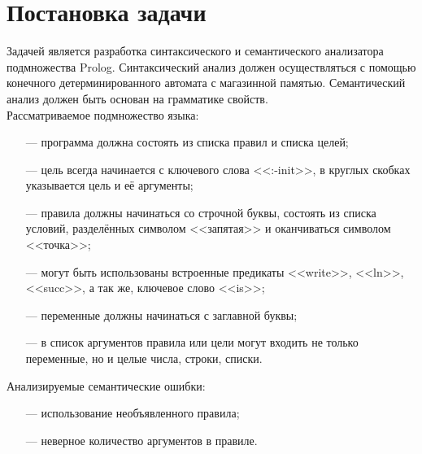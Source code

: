 \documentclass[a4paper,12pt]{article}
\newcommand{\psection}[1]{\newpage\section{#1}}
\begin{document}
    \psection{Постановка задачи}
    \label{sec:task} 
    Задачей является разработка синтаксического и семантического анализатора подмножества Prolog. Синтаксический
    анализ должен осуществляться с помощью конечного детерминированного автомата с магазинной памятью. Семантический
    анализ должен быть основан на грамматике свойств.\\
    Рассматриваемое подмножество языка:
    \begin{itemize}[leftmargin=*] \itemsep1pt
        \item[---] программа должна состоять из списка правил и списка целей;
        \item[---] цель всегда начинается с ключевого слова <<:-init>>, в круглых скобках указывается цель и её аргументы;
        \item[---] правила должны начинаться со строчной буквы, состоять из списка условий, разделённых символом <<запятая>> 
            и оканчиваться символом <<точка>>;
        \item[---] могут быть использованы встроенные предикаты <<write>>, <<ln>>, <<succ>>, а так же, ключевое слово <<is>>;
        \item[---] переменные должны начинаться с заглавной буквы;
        \item[---] в список аргументов правила или цели могут входить не только переменные, но и целые числа, строки, списки.
    \end{itemize}
    Анализируемые семантические ошибки:
    \begin{itemize}[leftmargin=*] \itemsep1pt
        \item[---] использование необъявленного правила;
        \item[---] неверное количество аргументов в правиле.
    \end{itemize}
\end{document}
